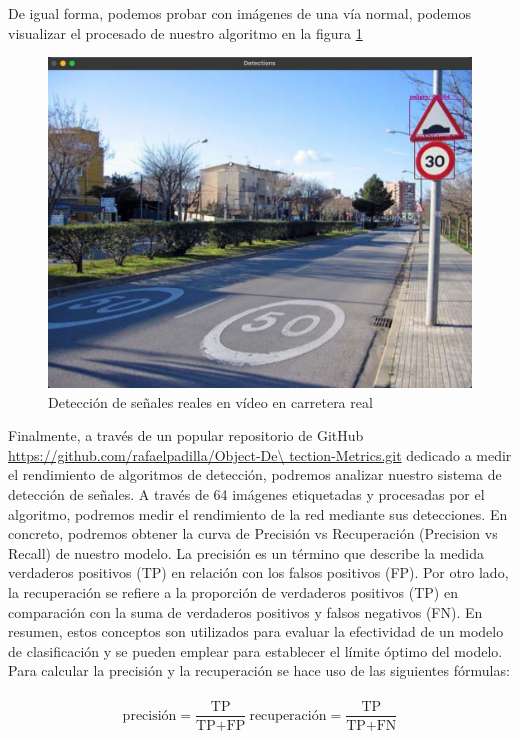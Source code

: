 De igual forma, podemos probar con imágenes de una vía normal, podemos visualizar el procesado de nuestro algoritmo en la figura \ref{deteccion3}\\

\begin{figure}[H]
    \centering
 	\includegraphics[width=\textwidth]{Imagenes/IA/deteccion3.pdf}
    \caption{Detección de señales reales en vídeo en carretera real}
    \label{deteccion3}
\end{figure}

Finalmente, a través de un popular repositorio de GitHub \url{https://github.com/rafaelpadilla/Object-De\ tection-Metrics.git} dedicado a medir el rendimiento de algoritmos de detección, podremos analizar nuestro sistema de detección de señales. A través de 64 imágenes etiquetadas y procesadas por el algoritmo, podremos medir el rendimiento de la red mediante sus detecciones. En concreto, podremos obtener la curva de Precisión vs Recuperación (Precision vs Recall) de nuestro modelo. La precisión es un término que describe la medida verdaderos positivos (TP) en relación con los falsos positivos (FP). Por otro lado, la recuperación se refiere a la proporción de verdaderos positivos (TP) en comparación con la suma de verdaderos positivos y falsos negativos (FN). En resumen, estos conceptos son utilizados para evaluar la efectividad de un modelo de clasificación y se pueden emplear para establecer el límite óptimo del modelo.\\

Para calcular la precisión y la recuperación se hace uso de las siguientes fórmulas:\\
\\
$$\text{precisión} = \frac{\text{TP}}{\text{TP} + \text{FP}}\ \text{recuperación} = \frac{\text{TP}}{\text{TP} + \text{FN}}$$
\\

